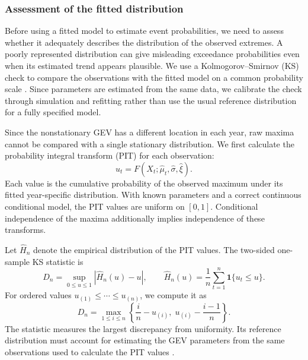 \documentclass[11pt]{article}
\begin{document}
\subsubsection{Assessment of the fitted distribution}
Before using a fitted model to estimate event probabilities, we need to
assess whether it adequately describes the distribution of the observed
extremes. A poorly represented distribution can give misleading
exceedance probabilities even when its estimated trend appears
plausible. We use a Kolmogorov--Smirnov (KS) check to compare the
observations with the fitted model on a common probability scale
\cite{massey1951kolmogorov}. Since parameters are estimated from the
same data,
we calibrate the check through simulation and refitting rather than
use the usual reference distribution for a fully specified model.

Since the
nonstationary
GEV has a different location in each year, raw maxima cannot be
compared
with a single stationary distribution. We first calculate the
probability integral transform (PIT) for each observation:
\begin{equation}
u_t=F(X_t;\widehat\mu_t,\widehat\sigma,\widehat\xi).
\end{equation}
Each value is the cumulative probability of the observed maximum under
its fitted year-specific distribution. With known parameters and a
correct continuous conditional model, the PIT values are uniform on
$[0,1]$. Conditional independence of the maxima additionally implies
independence of these transforms.

Let $\widehat H_n$ denote the empirical distribution of the PIT
values.
The two-sided one-sample KS statistic is
\begin{equation}
D_n=\sup_{0\leq u\leq1}|\widehat H_n(u)-u|,
\qquad
\widehat H_n(u)=\frac{1}{n}\sum_{t=1}^{n}
\mathbf{1}\{u_t\leq u\}.
\end{equation}
For ordered values $u_{(1)}\leq\cdots\leq u_{(n)}$, we compute it as
\begin{equation}
D_n=\max_{1\leq i\leq n}
\left\{\frac{i}{n}-u_{(i)},\;
u_{(i)}-\frac{i-1}{n}\right\}.
\end{equation}
The statistic measures the largest discrepancy from uniformity. Its
reference distribution must account for estimating the GEV parameters
from the same observations used to calculate the PIT values
\cite{durbin1973distribution}.
\end{document}
